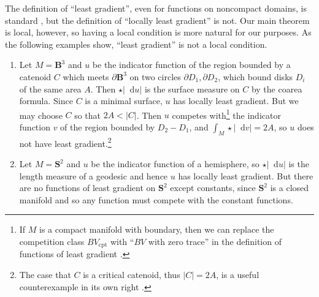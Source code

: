 \documentclass[reqno,11pt]{amsart}
\newcommand{\Sph}{\mathbf S}
\newcommand{\Ball}{\mathbf{B}}
\newcommand*\dif{\mathop{}\!\mathrm{d}}
\newcommand{\cpt}{\mathrm{cpt}}
\theoremstyle{definition}
\numberwithin{equation}{section}
\begin{document}
The definition of ``least gradient'', even for functions on noncompact domains, is standard \cite{Miranda67}, but the definition of ``locally least gradient'' is not.
Our main theorem is local, however, so having a local condition is more natural for our purposes.
As the following examples show, ``least gradient'' is not a local condition.
\begin{enumerate}
\item Let $M = \Ball^3$ and $u$ be the indicator function of the region bounded by a catenoid $C$ which meets $\partial \Ball^3$ on two circles $\partial D_1, \partial D_2$, which bound disks $D_i$ of the same area $A$.
Then $\star |\dif u|$ is the surface measure on $C$ by the coarea formula.
Since $C$ is a minimal surface, $u$ has locally least gradient.
But we may choose $C$ so that $2A < |C|$.
Then $u$ competes with\footnote{If $M$ is a compact manifold with boundary, then we can replace the competition class $BV_\cpt$ with ``$BV$ with zero trace'' in the definition of functions of least gradient \cite[\S9]{Korte19}.} the indicator function $v$ of the region bounded by $D_2 - D_1$, and $\int_M \star |\dif v| = 2A$, so $u$ does not have least gradient.\footnote{The case that $C$ is a critical catenoid, thus $|C| = 2A$, is a useful counterexample in its own right \cite[Example 4.3]{Gorny20}.}
\item Let $M = \Sph^2$ and $u$ be the indicator function of a hemisphere, so $\star |\dif u|$ is the length measure of a geodesic and hence $u$ has locally least gradient.
But there are no functions of least gradient on $\Sph^2$ except constants, since $\Sph^2$ is a closed manifold and so any function must compete with the constant functions.
\end{enumerate}
\end{document}
